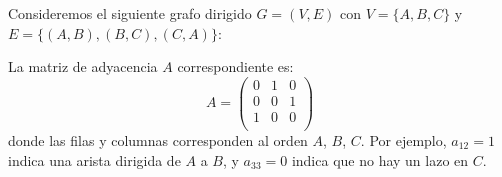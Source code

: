             \begin{ejemplo}
                Consideremos el siguiente grafo dirigido $G = (V, E)$ con $V = \{A, B, C\}$ y $E = \{(A,B), (B,C), (C,A)\}$:

                \begin{center}
                \end{center}

                La matriz de adyacencia $A$ correspondiente es:
                \[
                A =
                \begin{pmatrix}
                0 & 1 & 0 \\
                0 & 0 & 1 \\
                1 & 0 & 0 \\
                \end{pmatrix}
                \]
                donde las filas y columnas corresponden al orden $A$, $B$, $C$.
                Por ejemplo, $a_{12} = 1$ indica una arista dirigida de $A$ a $B$, y $a_{33} = 0$ indica que no hay un lazo en $C$.
            \end{ejemplo}

